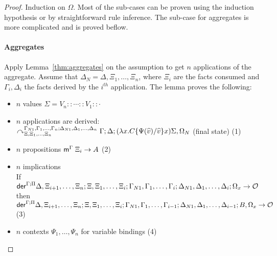 \begin{proof}\label{sec:derivation_theorem} Induction on $\Omega$. Most of the
sub-cases can be proven using the induction hypothesis or by straightforward
rule inference. The sub-case for aggregates is more
complicated and is proved beflow.

\paragraph{Aggregates} Apply Lemma~\ref{thm:aggregates} on the assumption to get
$n$ applications of the aggregate. Assume that $\Delta_N = \Delta, \Xi_1,
\dotsc, \Xi_n$, where $\Xi_i$ are the facts consumed and $\Gamma_i, \Delta_i$
the facts derived by the $i^{th}$ application.  The lemma proves the following:

\begin{itemize}[leftmargin=*]
   \item $n$ values $\Sigma = V_n :: \dotsb :: V_1 :: \cdot$
   \item $n$ applications are derived:\\
   $\curvearrowright_{\Xi, \Xi_1, \dotsc, \Xi_n}^{\Gamma_{N1},
      \Gamma_1, \dotsc, \Gamma_n; \Delta_{N1}, \Delta_1, \dotsc,
         \Delta_n} \Gamma; \Delta; (\lambda x.  C\{\Psi(\widehat{v})/\widehat{v}\} x) \Sigma,
            \Omega_N$ (final state) \hfill (1)
   \item $n$ propositions $\mathsf{m}^{\Gamma} \; \Xi_i \rightarrow A$ \hfill (2)
   \item $n$ implications\\
      If $\mathsf{der}^{\Gamma ; \Pi} \Delta, \Xi_{i+1}, \dotsc, \Xi_{n} ; \Xi, \Xi_1,
         \dotsc, \Xi_i; \Gamma_{N1}, \Gamma_1, \dotsc, \Gamma_i; \Delta_{N1},
            \Delta_1, \dotsc, \Delta_i; \Omega_x \rightarrow \mathcal{O}$ then\\
            \hspace*{2cm} $\mathsf{der}^{\Gamma ; \Pi} \Delta, \Xi_{i+1}, \dotsc, \Xi_{n} ; \Xi, \Xi_1,
            \dotsc, \Xi_i; \Gamma_{N1}, \Gamma_1, \dotsc, \Gamma_{i-1}; \Delta_{N1},
            \Delta_1, \dotsc, \Delta_{i-1}; B, \Omega_x \rightarrow \mathcal{O}$ \hfill (3)
   \item $n$ contexts $\Psi_1, \dotsc, \Psi_n$ for variable bindings \hfill (4)
\end{itemize}

\newcommand{\outsemm}[3]{#1, \Xi^{*}; #2, \Gamma^{*}; #3, \Delta^{*}}
\newcommand{\aggoutsem}[0]{\outsemm{\Xi, \Xi_1, \dotsc, \Xi_n}{\Gamma_{N1}, \Gamma_1, \dotsc,
      \Gamma_n}{\Delta_{N1}, \Delta_1, \dotsc, \Delta_n}}


\end{proof}
